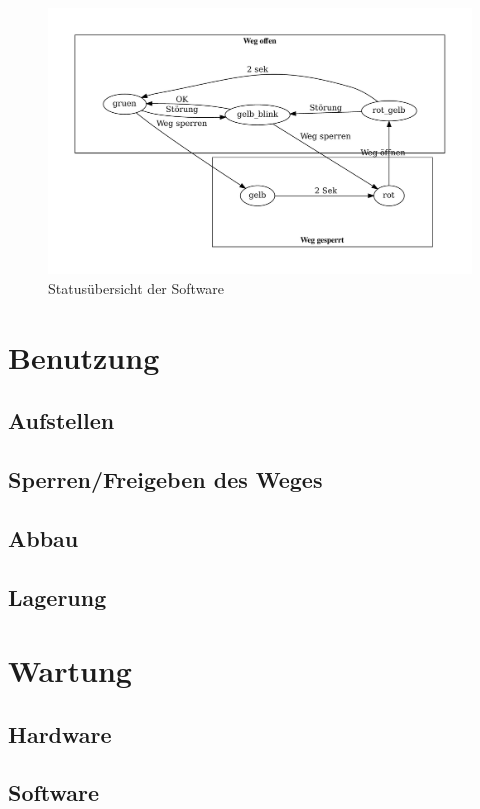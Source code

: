 \documentclass[a4paper, ngerman]{scrartcl}
\begin{document}
\begin{figure}
	\includegraphics[keepaspectratio, width=\textwidth]{system_statemachine.pdf}
	\caption{Statusübersicht der Software}
\end{figure}

\section{Benutzung}
\subsection{Aufstellen}
\subsection{Sperren/Freigeben des Weges}
\subsection{Abbau}
\subsection{Lagerung}

\section{Wartung}
\subsection{Hardware}
\subsection{Software}
\end{document}
